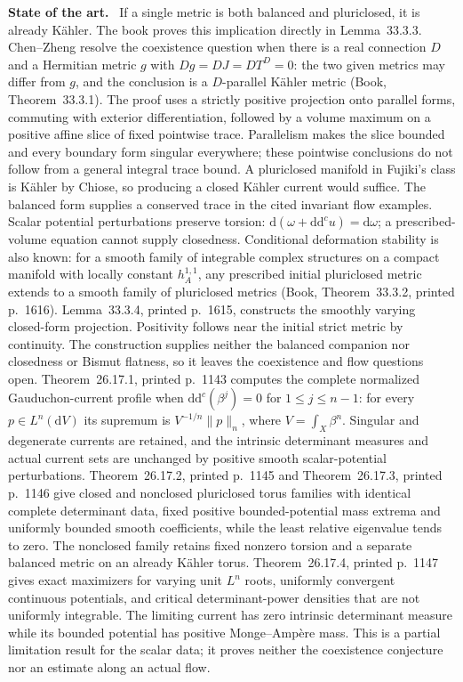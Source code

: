 \documentclass[11pt]{article}
\newcommand{\ddc}{\mathrm d\mathrm d^c}
\newcommand{\field}[1]{\par\medskip\noindent\textbf{#1.}\ }
\begin{document}
\field{State of the art} If a single metric is both balanced and pluriclosed, it is already K\"ahler. The book proves this implication directly in Lemma~33.3.3. Chen--Zheng resolve the coexistence question when there is a real connection $D$ and a Hermitian metric $g$ with $Dg=DJ=DT^D=0$: the two given metrics may differ from $g$, and the conclusion is a $D$-parallel K\"ahler metric (Book, Theorem~33.3.1). The proof uses a strictly positive projection onto parallel forms, commuting with exterior differentiation, followed by a volume maximum on a positive affine slice of fixed pointwise trace. Parallelism makes the slice bounded and every boundary form singular everywhere; these pointwise conclusions do not follow from a general integral trace bound. A pluriclosed manifold in Fujiki's class is K\"ahler by Chiose, so producing a closed K\"ahler current would suffice. The balanced form supplies a conserved trace in the cited invariant flow examples. Scalar potential perturbations preserve torsion: $\mathrm d(\omega+\ddc u)=\mathrm d\omega$; a prescribed-volume equation cannot supply closedness. Conditional deformation stability is also known: for a smooth family of integrable complex structures on a compact manifold with locally constant $h_A^{1,1}$, any prescribed initial pluriclosed metric extends to a smooth family of pluriclosed metrics (Book, Theorem~33.3.2, printed p.~1616). Lemma~33.3.4, printed p.~1615, constructs the smoothly varying closed-form projection. Positivity follows near the initial strict metric by continuity. The construction supplies neither the balanced companion nor closedness or Bismut flatness, so it leaves the coexistence and flow questions open. Theorem~26.17.1, printed p.~1143 computes the complete normalized Gauduchon-current profile when $\ddc(\beta^j)=0$ for $1\leq j\leq n-1$: for every $p\in L^n(\mathrm dV)$ its supremum is $V^{-1/n}\|p\|_n$, where $V=\int_X\beta^n$. Singular and degenerate currents are retained, and the intrinsic determinant measures and actual current sets are unchanged by positive smooth scalar-potential perturbations. Theorem~26.17.2, printed p.~1145 and Theorem~26.17.3, printed p.~1146 give closed and nonclosed pluriclosed torus families with identical complete determinant data, fixed positive bounded-potential mass extrema and uniformly bounded smooth coefficients, while the least relative eigenvalue tends to zero. The nonclosed family retains fixed nonzero torsion and a separate balanced metric on an already K\"ahler torus. Theorem~26.17.4, printed p.~1147 gives exact maximizers for varying unit $L^n$ roots, uniformly convergent continuous potentials, and critical determinant-power densities that are not uniformly integrable. The limiting current has zero intrinsic determinant measure while its bounded potential has positive Monge--Amp\`ere mass. This is a partial limitation result for the scalar data; it proves neither the coexistence conjecture nor an estimate along an actual flow.
\end{document}
